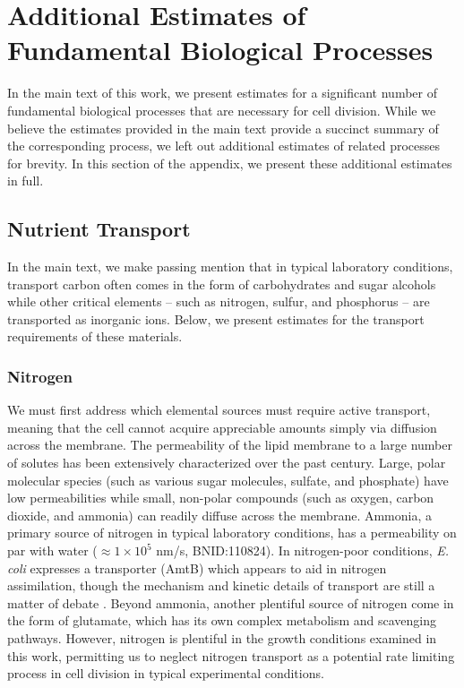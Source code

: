 \section{Additional Estimates of Fundamental Biological Processes}
\label{sec:SI_nutr_trans}

In the main text of this work, we present estimates for a significant number of
fundamental biological processes that are necessary for cell division. While we
believe the estimates provided in the main text provide a succinct summary of
the corresponding process, we left out additional estimates of related
processes for brevity. In this section of the appendix, we present these
additional estimates in full.


\subsection{Nutrient Transport}
In the main text, we make passing mention that in typical laboratory conditions, transport carbon often
comes in the form of carbohydrates and sugar alcohols while other critical
elements -- such as nitrogen, sulfur, and phosphorus -- are transported as
inorganic ions. Below, we present estimates for the transport requirements of
these materials.

\subsubsection{Nitrogen}
We must first address which elemental sources must require active transport,
meaning that the cell cannot acquire appreciable amounts simply via diffusion
across the membrane. The permeability of the lipid membrane to a large number
of solutes has been extensively characterized over the past century. Large,
polar molecular species (such as various sugar molecules, sulfate, and
phosphate) have low permeabilities while small, non-polar compounds (such as
oxygen, carbon dioxide, and ammonia) can readily diffuse across the membrane.
Ammonia, a primary source of nitrogen in typical laboratory conditions, has a
permeability on par with water ($\approx 1\times 10^{5}$ nm/s, BNID:110824). In
nitrogen-poor conditions, \textit{E. coli} expresses a transporter (AmtB)
which appears to aid in nitrogen assimilation, though the mechanism and
kinetic details of transport are still a matter of debate
\citep{heeswijk2013a, khademi2004}. Beyond ammonia, another plentiful source
of nitrogen come in the form of glutamate, which has its own complex
metabolism and scavenging pathways. However, nitrogen is plentiful in the
growth conditions examined in this work, permitting us to neglect nitrogen
transport as a potential rate limiting process in cell division in typical
experimental conditions.


